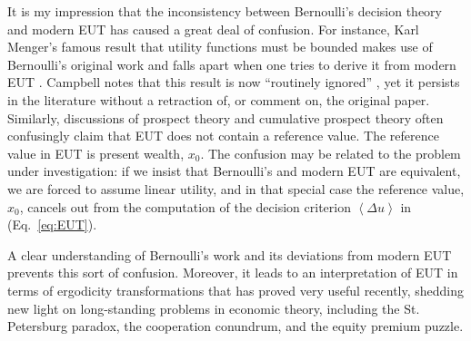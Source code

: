 \documentclass[pdftex]{article}
\newcommand{\ave}[1]{\left\langle#1 \right\rangle}
\newcommand{\eref}[1]{(Eq.~\ref{eq:#1})}
\newcommand{\Du}{\Delta u}
\begin{document}
It is my impression that the inconsistency between Bernoulli's decision theory and modern EUT has caused a great deal of confusion. For instance, Karl Menger's famous result that utility functions must be bounded \cite{Menger1934} makes use of Bernoulli's original work and falls apart when one tries to derive it from modern EUT \cite{Peters2011c,PetersGell-Mann2016}. Campbell notes that this result is now ``routinely ignored'' \cite[p.~5]{Campbell2017}, yet it persists in the literature without a retraction of, or comment on, the original paper. Similarly, discussions of prospect theory and cumulative prospect theory often confusingly claim that EUT does not contain a reference value. The reference value in EUT is present wealth, $x_0$. The confusion may be related to the problem under investigation: if we insist that Bernoulli's and modern EUT are equivalent, we are forced to assume linear utility, and in that special case the reference value, $x_0$, cancels out from the computation of the decision criterion $\ave{\Du}$ in \eref{EUT}.

A clear understanding of Bernoulli's work and its deviations from modern EUT prevents this sort of confusion. Moreover, it leads to an interpretation of EUT in terms of ergodicity transformations that has proved very useful recently, shedding new light on long-standing problems in economic theory, including the St. Petersburg paradox, the cooperation conundrum, and the equity premium puzzle.



\end{document}
